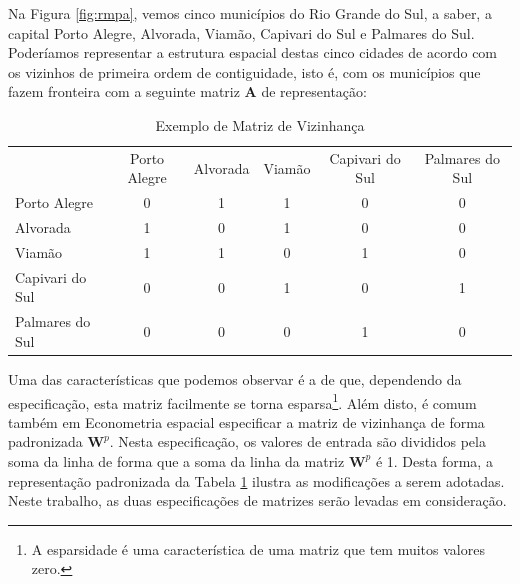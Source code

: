 \documentclass[12pt,openright,oneside,a4paper,english,french,spanish]{abntex2}
\numberwithin{table}{section} %
\numberwithin{figure}{section} %
\begin{document}
Na Figura \ref{fig:rmpa}, vemos cinco municípios do Rio Grande do Sul, a saber, a capital Porto Alegre, Alvorada, Viamão, Capivari do Sul e Palmares do Sul. Poderíamos representar a estrutura espacial destas cinco cidades de acordo com os vizinhos de primeira ordem de contiguidade, isto é, com os municípios que fazem fronteira com a seguinte matriz $\mathbf{A}$ de representação:

\begin{table}[H]
\centering
\caption{Exemplo de Matriz de Vizinhança}
\label{tab:matriz_vizinhanca}
\begin{tabular}{lccccc}
                                     & Porto Alegre           & Alvorada               & Viamão                 & Capivari do Sul        & Palmares do Sul        \\ \cline{2-6} 
\multicolumn{1}{l|}{Porto Alegre}    & \multicolumn{1}{c|}{0} & \multicolumn{1}{c|}{1} & \multicolumn{1}{c|}{1} & \multicolumn{1}{c|}{0} & \multicolumn{1}{c|}{0} \\ \cline{2-6} 
\multicolumn{1}{l|}{Alvorada}        & \multicolumn{1}{c|}{1} & \multicolumn{1}{c|}{0} & \multicolumn{1}{c|}{1} & \multicolumn{1}{c|}{0} & \multicolumn{1}{c|}{0} \\ \cline{2-6} 
\multicolumn{1}{l|}{Viamão}          & \multicolumn{1}{c|}{1} & \multicolumn{1}{c|}{1} & \multicolumn{1}{c|}{0} & \multicolumn{1}{c|}{1} & \multicolumn{1}{c|}{0} \\ \cline{2-6} 
\multicolumn{1}{l|}{Capivari do Sul} & \multicolumn{1}{c|}{0} & \multicolumn{1}{c|}{0} & \multicolumn{1}{c|}{1} & \multicolumn{1}{c|}{0} & \multicolumn{1}{c|}{1} \\ \cline{2-6} 
\multicolumn{1}{l|}{Palmares do Sul} & \multicolumn{1}{c|}{0} & \multicolumn{1}{c|}{0} & \multicolumn{1}{c|}{0} & \multicolumn{1}{c|}{1} & \multicolumn{1}{c|}{0} \\ \cline{2-6} 
\end{tabular}
\end{table}

Uma das características que podemos observar é a de que, dependendo da especificação, esta matriz facilmente se torna esparsa\footnote{A esparsidade é uma característica de uma matriz que tem muitos valores zero.}. Além disto, é comum também em Econometria espacial especificar a matriz de vizinhança de forma padronizada $\mathbf{W}^{p}$. Nesta especificação, os valores de entrada são divididos pela soma da linha de forma que a soma da linha da matriz $\mathbf{W}^{p}$ é 1. Desta forma, a representação padronizada da Tabela \ref{tab:matriz_vizinhanca} ilustra as modificações a serem adotadas. Neste trabalho, as duas especificações de matrizes serão levadas em consideração.
\end{document}
